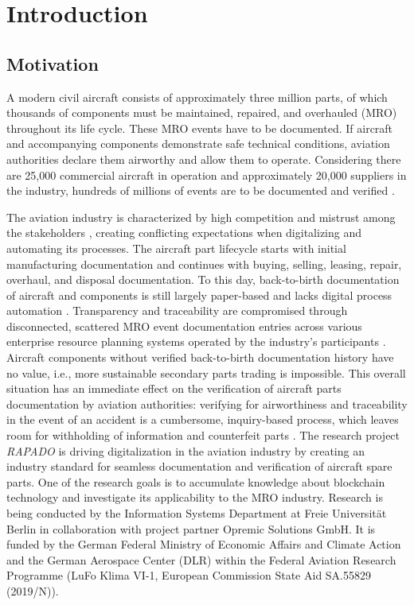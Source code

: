 \chapter{Introduction}
\section{Motivation}
A modern civil aircraft consists of approximately three million parts, of which thousands of components must be maintained, repaired, and overhauled (MRO) throughout its life cycle. These MRO events have to be documented. If aircraft and accompanying components demonstrate safe technical conditions, aviation authorities declare them airworthy and allow them to operate. Considering there are 25,000 commercial aircraft in operation and approximately 20,000 suppliers in the industry, hundreds of millions of events are to be documented and verified \citep{mroBCservices1}.

The aviation industry is characterized by high competition and mistrust among the stakeholders \cite{Chatzi2019TDoC}, creating conflicting expectations when digitalizing and automating its processes. The aircraft part lifecycle starts with initial manufacturing documentation and continues with buying, selling, leasing, repair, overhaul, and disposal documentation. To this day, back-to-birth documentation of aircraft and components is still largely paper-based and lacks digital process automation \citep{efthymiou}. Transparency and traceability are compromised through disconnected, scattered MRO event documentation entries across various enterprise resource planning systems operated by the industry's participants \citep{mroBCservices1}. Aircraft components without verified back-to-birth documentation history have no value, i.e., more sustainable secondary parts trading is impossible. This overall situation has an immediate effect on the verification of aircraft parts documentation by aviation authorities: verifying for airworthiness and traceability in the event of an accident is a cumbersome, inquiry-based process, which leaves room for withholding of information and counterfeit parts \citep{planecrash}. 
The research project \textit{RAPADO} is driving digitalization in the aviation industry by creating an industry standard for seamless documentation and verification of aircraft spare parts. One of the research goals is to accumulate knowledge about blockchain technology and investigate its applicability to the MRO industry. Research is being conducted by the Information Systems Department at Freie Universit{\"a}t Berlin in collaboration with project partner Opremic Solutions GmbH. It is funded by the German Federal Ministry of Economic Affairs and Climate Action and the German Aerospace Center (DLR) within the Federal Aviation Research Programme (LuFo Klima VI-1, European Commission State Aid SA.55829 (2019/N)).


